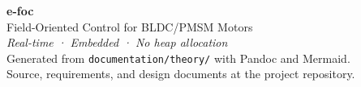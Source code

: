 \cleardoublepage
\thispagestyle{empty}
\vspace*{\fill}
\begin{center}
{\Large\bfseries\color{RoyalBlue} e-foc}\\[0.5em]
{\large Field-Oriented Control for BLDC/PMSM Motors}\\[2em]
{\itshape Real-time · Embedded · No heap allocation}\\[2em]
Generated from \texttt{documentation/theory/} with Pandoc and Mermaid.\\[0.5em]
Source, requirements, and design documents at the project repository.
\end{center}
\vspace*{\fill}

